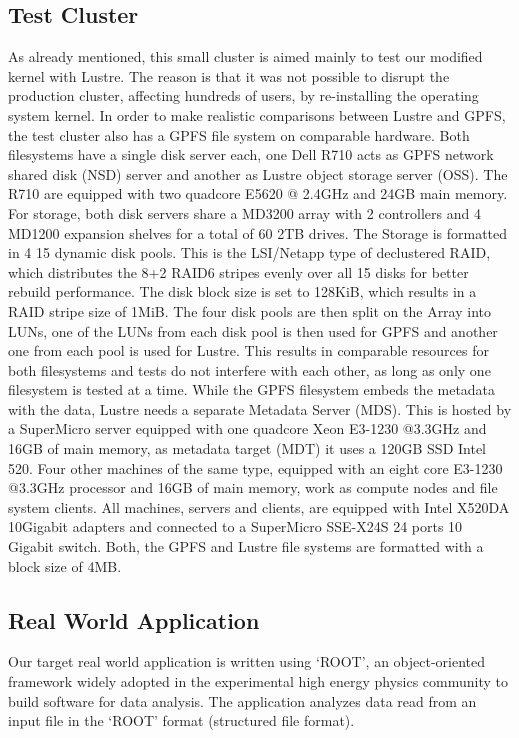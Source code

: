 \subsection{Test Cluster}
\label{subsec: test_cluster}
As already mentioned, this small cluster is aimed mainly to test our modified kernel with Lustre. The reason is that it was not possible to disrupt the production cluster, affecting hundreds of users, by re-installing the operating system kernel. In order to make realistic comparisons between Lustre and GPFS, the test cluster also has a GPFS file system on comparable hardware. Both filesystems have a single disk server each, one Dell R710 acts as GPFS network shared disk (NSD) server and another as Lustre object storage server (OSS). The R710 are equipped with two quadcore E5620 @ 2.4GHz and 24GB main memory. For storage, both disk servers share a MD3200 array with 2 controllers and 4 MD1200 expansion shelves for a total of 60 2TB drives. The Storage is formatted in 4 15 dynamic disk pools. This is the LSI/Netapp type of declustered RAID, which distributes the 8+2 RAID6 stripes evenly over all 15 disks for better rebuild performance. The disk block size is set to 128KiB, which results in a RAID stripe size of 1MiB. The four disk pools are then split on the Array into LUNs, one of the LUNs from each disk pool is then used for GPFS and another one from each pool is used for Lustre. This results in comparable resources for both filesystems and tests do not interfere with each other, as long as only one filesystem is tested at a time. While the GPFS filesystem embeds the metadata with the data, Lustre needs a separate Metadata Server (MDS). This is hosted by a SuperMicro server equipped with one quadcore Xeon E3-1230 @3.3GHz and 16GB of main memory, as metadata target (MDT) it uses a 120GB SSD Intel 520. Four other machines of the same type, equipped with an eight core E3-1230 @3.3GHz processor and 16GB of main memory, work as compute nodes and file system clients. All machines, servers and clients, are equipped with Intel X520DA 10Gigabit adapters and connected to a SuperMicro SSE-X24S 24 ports 10 Gigabit switch. Both, the GPFS and Lustre file systems are formatted with a block size of 4MB.

\subsection{Real World Application}
\label{subsec: application}
Our target real world application is written using `ROOT', an object-oriented framework widely adopted in the experimental high energy physics community to build software for data analysis. The application analyzes data read from an input file in the `ROOT' format (structured file format). 


